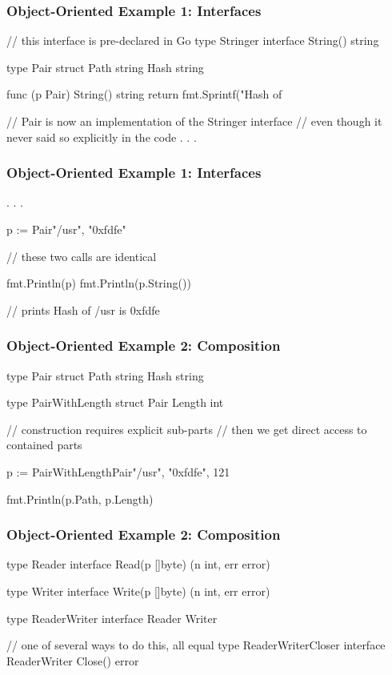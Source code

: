 \documentclass[compress,t,11pt]{beamer}
\begin{document}
\begin{frame}[fragile]
    \frametitle{Object-Oriented Example 1: Interfaces}
\begin{golang}
// this interface is pre-declared in Go
type Stringer interface {
    String() string
}

type Pair struct {
    Path string
    Hash string
}

func (p Pair) String() string {
	return fmt.Sprintf("Hash of %
}

// Pair is now an implementation of the Stringer interface
// even though it never said so explicitly in the code
. . .
\end{golang}
\end{frame}
\begin{frame}[fragile]
    \frametitle{Object-Oriented Example 1: Interfaces}
\begin{golang}
. . .

p := Pair{"/usr", "0xfdfe"}

// these two calls are identical

fmt.Println(p)
fmt.Println(p.String())

// prints Hash of /usr is 0xfdfe
\end{golang}
\end{frame}

\begin{frame}[fragile]
    \frametitle{Object-Oriented Example 2: Composition}
\begin{golang}
type Pair struct {
    Path string
    Hash string
}

type PairWithLength struct {
    Pair
    Length int
}

// construction requires explicit sub-parts
// then we get direct access to contained parts

p := PairWithLength{Pair{"/usr", "0xfdfe"}, 121}

fmt.Println(p.Path, p.Length)
\end{golang}
\end{frame}

\begin{frame}[fragile]
    \frametitle{Object-Oriented Example 2: Composition}
\begin{golang}
type Reader interface {
    Read(p []byte) (n int, err error)
}

type Writer interface {
    Write(p []byte) (n int, err error)
}

type ReaderWriter interface {
    Reader
    Writer
}

// one of several ways to do this, all equal
type ReaderWriterCloser interface {
    ReaderWriter
    Close() error
}
\end{golang}
\end{frame}
\end{document}

